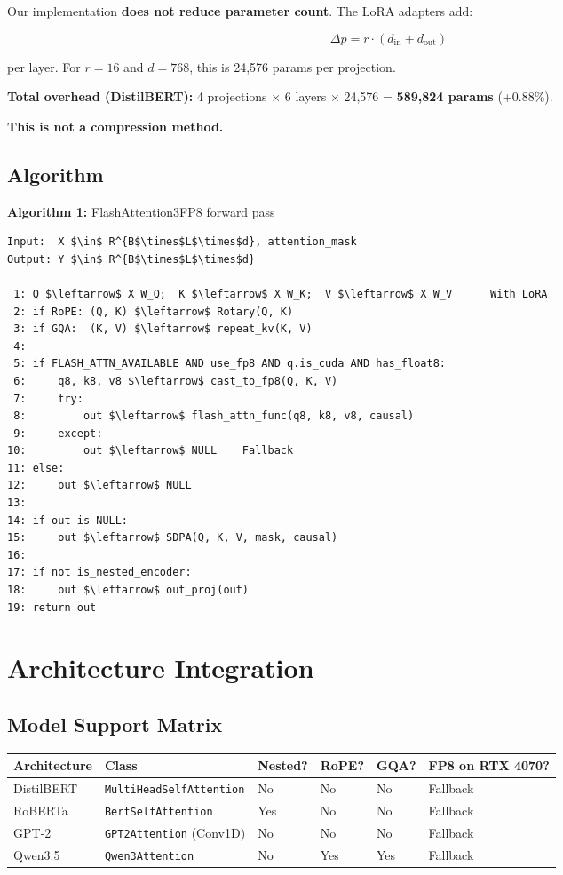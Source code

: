 Our implementation \textbf{does not reduce parameter count}. The LoRA adapters 
add:

\[
\Delta p = r \cdot (d_\text{in} + d_\text{out})
\tag{4.1}
\]

per layer. For $r = 16$ and $d = 768$, this is 24,576 params per projection.

\textbf{Total overhead (DistilBERT):} 4 projections $\times$ 6 layers $\times$ 24,576 = 
\textbf{589,824 params} (+0.88\%).

\textbf{This is not a compression method.}

\subsection{Algorithm}

\textbf{Algorithm 1:} FlashAttention3FP8 forward pass
\begin{lstlisting}
Input:  X $\in$ R^{B$\times$L$\times$d}, attention_mask
Output: Y $\in$ R^{B$\times$L$\times$d}

 1: Q $\leftarrow$ X W_Q;  K $\leftarrow$ X W_K;  V $\leftarrow$ X W_V      With LoRA
 2: if RoPE: (Q, K) $\leftarrow$ Rotary(Q, K)
 3: if GQA:  (K, V) $\leftarrow$ repeat_kv(K, V)
 4:
 5: if FLASH_ATTN_AVAILABLE AND use_fp8 AND q.is_cuda AND has_float8:
 6:     q8, k8, v8 $\leftarrow$ cast_to_fp8(Q, K, V)
 7:     try:
 8:         out $\leftarrow$ flash_attn_func(q8, k8, v8, causal)
 9:     except:
10:         out $\leftarrow$ NULL    Fallback
11: else:
12:     out $\leftarrow$ NULL
13:
14: if out is NULL:
15:     out $\leftarrow$ SDPA(Q, K, V, mask, causal)
16:
17: if not is_nested_encoder:
18:     out $\leftarrow$ out_proj(out)
19: return out
\end{lstlisting}




\section{Architecture Integration}

\subsection{Model Support Matrix}

\begin{table}[H]
\centering
\small
\begin{tabular}{llllll}
\toprule
\textbf{Architecture} & \textbf{Class} & \textbf{Nested?} & \textbf{RoPE?} & \textbf{GQA?} & \textbf{FP8 on RTX 4070?} \\
\midrule
DistilBERT & \texttt{MultiHeadSelfAttention} & No & No & No & Fallback \\
RoBERTa & \texttt{BertSelfAttention} & Yes & No & No & Fallback \\
GPT-2 & \texttt{GPT2Attention} (Conv1D) & No & No & No & Fallback \\
Qwen3.5 & \texttt{Qwen3Attention} & No & Yes & Yes & Fallback \\
\bottomrule
\end{tabular}
\end{table}

